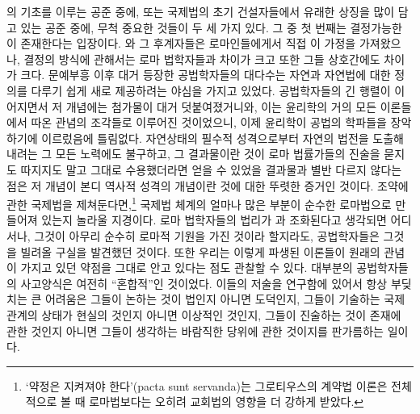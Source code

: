 의 기초를 이루는 공준 중에,
또는 국제법의 초기 건설자들에서 유래한 상징을 많이 담고 있는 공준 중에,
무척 중요한 것들이 두 세 가지 있다.
그 중 첫 번째는 결정가능한 이 존재한다는 입장이다.
와 그 후계자들은 로마인들에게서 직접 이 가정을 가져왔으나,
결정의 방식에 관해서는
로마 법학자들과 차이가 크고 또한 그들 상호간에도 차이가 크다.
문예부흥 이후 대거 등장한 공법학자들의 대다수는
자연과 자연법에 대한 정의를 다루기 쉽게 새로 제공하려는
야심을 가지고 있었다.
공법학자들의 긴 행렬이 이어지면서 저 개념에는 첨가물이 대거 덧붙여졌거니와,
이는 윤리학의 거의 모든 이론들에서 따온 관념의 조각들로 이루어진 것이었으니,
이제 윤리학이 공법의 학파들을 장악하기에 이르렀음에 틀림없다.
자연상태의 필수적 성격으로부터 자연의 법전을 도출해내려는
그 모든 노력에도 불구하고, 그 결과물이란 것이
로마 법률가들의 진술을 묻지도 따지지도 말고 그대로 수용했더라면
얻을 수 있었을 결과물과 별반 다르지 않다는 점은
저 개념이 본디 역사적 성격의 개념이란 것에 대한 뚜렷한 증거인 것이다.
조약에 관한 국제법을 제쳐둔다면,\footnote{%
  `약정은 지켜져야 한다'(pacta sunt servanda)는
  그로티우스의 계약법 이론은 전체적으로 볼 때
  로마법보다는 오히려 교회법의 영향을 더 강하게 받았다.}
국제법 체계의 얼마나 많은 부분이 순수한 로마법으로 만들어져 있는지
놀라울 지경이다.
로마 법학자들의 법리가 과 조화된다고 생각되면
어디서나,
그것이 아무리 순수히 로마적 기원을 가진 것이라 할지라도,
공법학자들은 그것을 빌려올 구실을 발견했던 것이다.
또한 우리는
이렇게 파생된 이론들이
원래의 관념이 가지고 있던 약점을
그대로 안고 있다는 점도 관찰할 수 있다.
대부분의 공법학자들의 사고양식은 여전히 ``혼합적''인 것이었다.
이들의 저술을 연구함에 있어서 항상 부딪치는 큰 어려움은
그들이 논하는 것이 법인지 아니면 도덕인지,
그들이 기술하는 국제관계의 상태가 현실의 것인지 아니면 이상적인 것인지,
그들이 진술하는 것이 존재에 관한 것인지 아니면
그들이 생각하는 바람직한 당위에 관한 것이지를 판가름하는 일이다.

